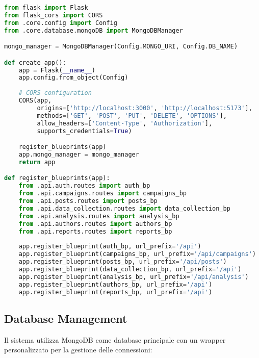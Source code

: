 \documentclass[12pt,a4paper]{report}
\begin{document}
\begin{lstlisting}[language=Python, caption=Flask Application Factory]
from flask import Flask
from flask_cors import CORS
from .core.config import Config
from .core.database.mongoDB import MongoDBManager

mongo_manager = MongoDBManager(Config.MONGO_URI, Config.DB_NAME)

def create_app():
    app = Flask(__name__)
    app.config.from_object(Config)
    
    # CORS configuration
    CORS(app, 
         origins=['http://localhost:3000', 'http://localhost:5173'],
         methods=['GET', 'POST', 'PUT', 'DELETE', 'OPTIONS'],
         allow_headers=['Content-Type', 'Authorization'],
         supports_credentials=True)

    register_blueprints(app)
    app.mongo_manager = mongo_manager
    return app

def register_blueprints(app):
    from .api.auth.routes import auth_bp
    from .api.campaigns.routes import campaigns_bp
    from .api.posts.routes import posts_bp
    from .api.data_collection.routes import data_collection_bp
    from .api.analysis.routes import analysis_bp
    from .api.authors.routes import authors_bp
    from .api.reports.routes import reports_bp
    
    app.register_blueprint(auth_bp, url_prefix='/api')
    app.register_blueprint(campaigns_bp, url_prefix='/api/campaigns')
    app.register_blueprint(posts_bp, url_prefix='/api/posts')
    app.register_blueprint(data_collection_bp, url_prefix='/api')
    app.register_blueprint(analysis_bp, url_prefix='/api/analysis')
    app.register_blueprint(authors_bp, url_prefix='/api')
    app.register_blueprint(reports_bp, url_prefix='/api')
\end{lstlisting}

\subsection{Database Management}

Il sistema utilizza MongoDB come database principale con un wrapper personalizzato per la gestione delle connessioni:
\end{document}
